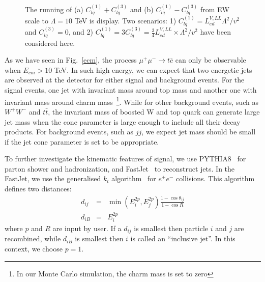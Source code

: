 \documentclass[a4paper,11pt]{article}
\begin{document}
\begin{figure}
  \centering
  \caption{The running of (a) $C^{(1)}_{lq}+C^{(3)}_{lq}$ and (b) $C^{(1)}_{lq}-C^{(3)}_{lq}$ from EW scale to $\Lambda=10$ TeV is display.  Two scenarios: 1) $C^{(1)}_{lq}=L^{V,LL}_{ed}\Lambda^2/v^2$ and $C^{(3)}_{lq}=0$, and 2) $C^{(1)}_{lq}=3C^{(3)}_{lq}=\frac{3}{4}L^{V,LL}_{ed}\times \Lambda^2/v^2$ have been considered here.\label{rge:EWtoUV}}
\end{figure}

As we have seen in Fig.~\ref{ecm}, the process $\mu^+\mu^-\to t\bar{c}$ can only be observable when $E_{cm}>10$ TeV.  
In such high energy, we can expect that two energetic jets are observed at the detector for either signal and background events. 
For the signal events, one jet with invariant mass around top mass and another one with invariant mass around charm mass~\footnote{In our Monte Carlo simulation, the charm mass is set to zero}. 
While for other background events, such as $W^+ W^-$ and $t \bar{t}$, the invariant mass of boosted W and top quark can generate large jet mass when the cone parameter is large enough to include all their decay products.
For background events, such as $j j$, we expect jet mass should be small if the jet cone parameter is set to be appropriate.

To further investigate the kinematic features of signal, 
we use PYTHIA8~\cite{Bierlich:2022pfr} for parton shower and hadronization, 
and FastJet~\cite{Cacciari:2011ma} to reconstruct jets.  
In the FastJet, we use the generalised $k_t$ algorithm~\cite{Catani:1991hj} for $e^+e^-$ collisions. 
This algorithm defines two distances:
\begin{eqnarray}
  d_{ij} &=& \min(E^{2p}_i,E^{2p}_j)\frac{1-\cos\theta_{ij}}{1-\cos{R}} \nonumber \\
  d_{iB} &=& E^{2p}_i \nonumber 
\end{eqnarray}
where $p$ and $R$ are input by user. If a $d_{ij}$ is smallest then particle $i$ and $j$ are recombined, while $d_{iB}$ is smallest then $i$ is called an ``inclusive jet''.
In this context, we choose $p=1$.
\end{document}
